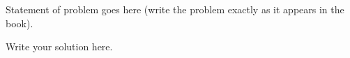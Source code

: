 \begin{problem}{1} 
    Statement of problem goes here (write the problem exactly as it appears in the book).
\end{problem}



\begin{sol}
    Write your solution here.
\end{sol}